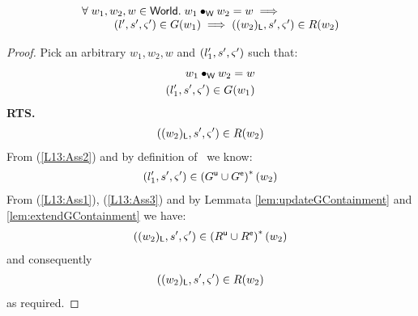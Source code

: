 \begin{lemma}[] \label{lem:guaranteeContainment}
%
\[
\begin{array}{l}
	\forall\; w_1, w_2, w \in \textsf{World}.\; w_1 \bullet_{\textsf{W}} w_2 = w \implies\\
	\hspace*{1cm}(l', s', \varsigma_{}') \in G(w_1) \implies ((w_2)_{\textsf{L}}, s', \varsigma_{}') \in R(w_2)
\end{array}
\]
%
\begin{proof} Pick an arbitrary $w_1, w_2, w$ and $(l'_1, s', \varsigma_{}')$ such that:
%
\begin{align}
	w_1 \bullet_{\textsf{W}} w_2 = w \label{L13:Ass1}\\
	(l'_1, s', \varsigma_{}') \in G(w_1) \label{L13:Ass2}
\end{align}
%
\textbf{RTS.}
%
\begin{align}
	((w_2)_{\textsf{L}}, s', \varsigma_{}') \in R(w_2) \label{L13:Goal}
\end{align}
From (\ref{L13:Ass2}) and by definition of \guarantee\ we know:
%
\begin{align}
	(l'_1, s', \varsigma_{}') \in \left(G^{\textsf{u}} \cup G^{\textsf{e}} \right)^{*}(w_2) \label{L13:Ass3}
\end{align}
%
From (\ref{L13:Ass1}), (\ref{L13:Ass3}) and by Lemmata \ref{lem:updateGContainment} and \ref{lem:extendGContainment} we have:
%
\begin{align}
	((w_2)_{\textsf{L}}, s', \varsigma_{}') \in \left(R^{\textsf{u}} \cup R^{\textsf{e}} \right)^{*}(w_2) \nonumber
\end{align}
%
and consequently 
%
\begin{align}
	((w_2)_{\textsf{L}}, s', \varsigma_{}') \in R(w_2) \nonumber
\end{align}
%
as required.
\end{proof}
\end{lemma}
